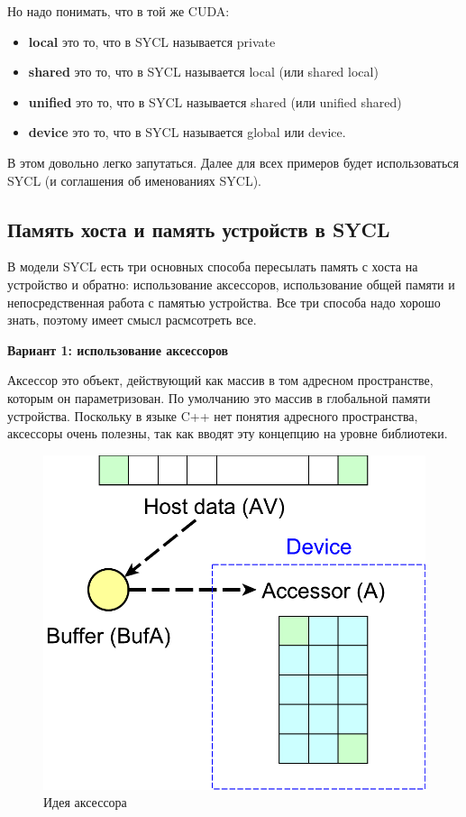 \documentclass[a4paper,12pt,oneside]{article}
\begin{document}
Но надо понимать, что в той же CUDA:
\begin{itemize}
\item \textbf{local} это то, что в SYCL называется private
\item \textbf{shared} это то, что в SYCL называется local (или shared local)
\item \textbf{unified} это то, что в SYCL называется shared (или unified shared)
\item \textbf{device} это то, что в SYCL называется global или device.
\end{itemize}

В этом довольно легко запутаться. Далее для всех примеров будет использоваться SYCL (и соглашения об именованиях SYCL).

\subsection{Память хоста и память устройств в SYCL}\label{subsec:memsend}

В модели SYCL есть три основных способа пересылать память с хоста на устройство и обратно: использование аксессоров, использование общей памяти и непосредственная работа с памятью устройства.
Все три способа надо хорошо знать, поэтому имеет смысл расмсотреть все.

\textbf{Вариант 1: использование аксессоров}

Аксессор это объект, действующий как массив в том адресном пространстве, которым он параметризован.
По умолчанию это массив в глобальной памяти устройства.
Поскольку в языке C++ нет понятия адресного пространства, аксессоры очень полезны, так как вводят эту концепцию на уровне библиотеки.

\begin{figure}
\centering
\includegraphics[width=1.0\textwidth]{pictures/accessors.pdf}
\caption{Идея аксессора}
\label{fig:accessors}
\end{figure}
\end{document}
